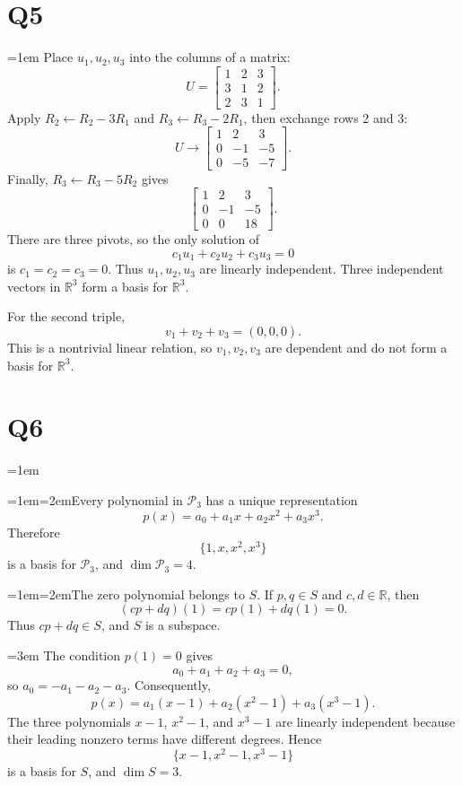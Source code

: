 \documentclass[11pt]{article}
\newcommand{\solutionquestion}[1]{\par\leftskip=0pt\section*{Q#1}\leftskip=1em}
\newcommand{\solutionpart}[1]{\par\smallskip\leftskip=1em\noindent\hangindent=2em\hangafter=1\makebox[1.5em][l]{\textbf{(#1)}}\hspace{0.5em}\ignorespaces}
\newcommand{\solutioncontinuation}{\par\leftskip=3em\noindent\ignorespaces}
\begin{document}
\solutionquestion{5}
Place $u_1,u_2,u_3$ into the columns of a matrix:
\[
U=\begin{bmatrix}
1&2&3\\
3&1&2\\
2&3&1
\end{bmatrix}.
\]
Apply $R_2\leftarrow R_2-3R_1$ and $R_3\leftarrow R_3-2R_1$, then exchange rows 2 and 3:
\[
U\longrightarrow
\begin{bmatrix}
1&2&3\\
0&-1&-5\\
0&-5&-7
\end{bmatrix}.
\]
Finally, $R_3\leftarrow R_3-5R_2$ gives
\[
\begin{bmatrix}
1&2&3\\
0&-1&-5\\
0&0&18
\end{bmatrix}.
\]
There are three pivots, so the only solution of
\[
c_1u_1+c_2u_2+c_3u_3=0
\]
is $c_1=c_2=c_3=0$. Thus $u_1,u_2,u_3$ are linearly independent. Three independent vectors in $\mathbb R^3$ form a basis for $\mathbb R^3$.

For the second triple,
\[
v_1+v_2+v_3=(0,0,0).
\]
This is a nontrivial linear relation, so $v_1,v_2,v_3$ are dependent and do not form a basis for $\mathbb R^3$.

\solutionquestion{6}
\solutionpart{i}Every polynomial in $\mathcal P_3$ has a unique representation
\[
p(x)=a_0+a_1x+a_2x^2+a_3x^3.
\]
Therefore
\[
\{1,x,x^2,x^3\}
\]
is a basis for $\mathcal P_3$, and $\dim\mathcal P_3=4$.

\solutionpart{ii}The zero polynomial belongs to $S$. If $p,q\in S$ and $c,d\in\mathbb R$, then
\[
{(cp+dq)}(1)=cp(1)+dq(1)=0.
\]
Thus $cp+dq\in S$, and $S$ is a subspace.

\solutioncontinuation{} The condition $p(1)=0$ gives
\[
a_0+a_1+a_2+a_3=0,
\]
so $a_0=-a_1-a_2-a_3$. Consequently,
\[
p(x)=a_1(x-1)+a_2(x^2-1)+a_3(x^3-1).
\]
The three polynomials $x-1$, $x^2-1$, and $x^3-1$ are linearly independent because their leading nonzero terms have different degrees. Hence
\[
\{x-1,x^2-1,x^3-1\}
\]
is a basis for $S$, and $\dim S=3$.
\end{document}
